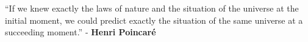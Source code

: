 \thispagestyle{empty}
\begin{center}
\LARGE ``If we knew exactly the laws of nature and the situation of the universe at the initial moment, we could predict exactly the situation of the same universe at a succeeding moment.'' \newline - {\bf Henri Poincar\'e}
\end{center}



